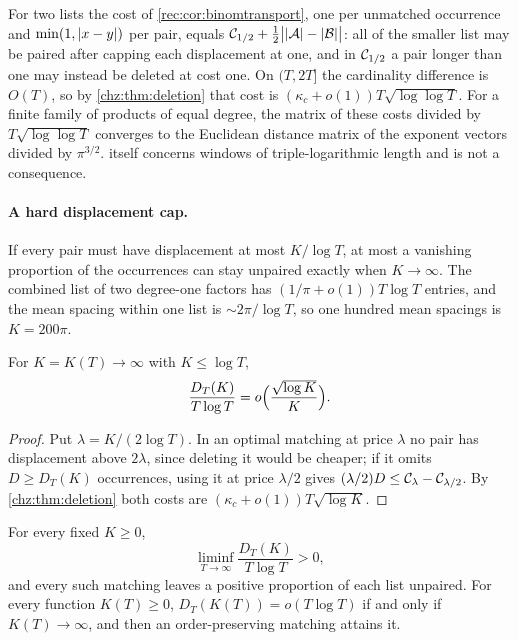 \begin{remark}\label{chz:rem:dyadicmetric}
For two lists the cost of \cref{rec:cor:binomtransport}, one per unmatched occurrence and $\min(1,\lvert x-y\rvert)$ per
pair, equals $\mathcal{C}_{1/2}+\tfrac12\bigl\lvert\lvert\mathcal{A}\rvert-\lvert\mathcal{B}\rvert\bigr\rvert$: all of the smaller list may be paired after
capping each displacement at one, and in $\mathcal{C}_{1/2}$ a pair longer than one may instead be deleted at cost one.
On $(T,2T]$ the cardinality difference is $O(T)$, so by \cref{chz:thm:deletion} that cost is
$(\kappa_c+o(1))T\sqrt{\log\log T}$. For a finite family of products of equal degree, the matrix of these costs
divided by $T\sqrt{\log\log T}$ converges to the Euclidean distance matrix of the exponent vectors divided by
$\pi^{3/2}$.  itself concerns windows of triple-logarithmic length and is not a
consequence.
\end{remark}

\paragraph{A hard displacement cap.}
If every pair must have displacement at most $K/\log T$, at most a vanishing proportion of the occurrences can
stay unpaired exactly when $K\to\infty$. The combined list of two degree-one factors has $(1/\pi+o(1))T\log T$
entries, and the mean spacing within one list is $\sim2\pi/\log T$, so one hundred mean spacings is $K=200\pi$.

\begin{corollary}\label{chz:cor:hardcap}
For $K=K(T)\to\infty$ with $K\le\log T$,
\[
 \frac{D_T(K)}{T\log T}=o\Bigl(\frac{\sqrt{\log K}}K\Bigr).
\]
\end{corollary}

\begin{proof}
Put $\lambda=K/(2\log T)$. In an optimal matching at price $\lambda$ no pair has displacement above $2\lambda$, since
deleting it would be cheaper; if it omits $D\ge D_T(K)$ occurrences, using it at price $\lambda/2$ gives
$(\lambda/2)D\le\mathcal{C}_\lambda-\mathcal{C}_{\lambda/2}$. By \cref{chz:thm:deletion} both costs are $(\kappa_c+o(1))T\sqrt{\log K}$.
\end{proof}

\begin{theorem}\label{chz:thm:threshold}
For every fixed $K\ge0$,
\[
 \liminf_{T\to\infty}\frac{D_T(K)}{T\log T}>0 ,
\]
and every such matching leaves a positive proportion of each list unpaired. For every function $K(T)\ge0$,
$D_T(K(T))=o(T\log T)$ if and only if $K(T)\to\infty$, and then an order-preserving matching attains it.
\end{theorem}

